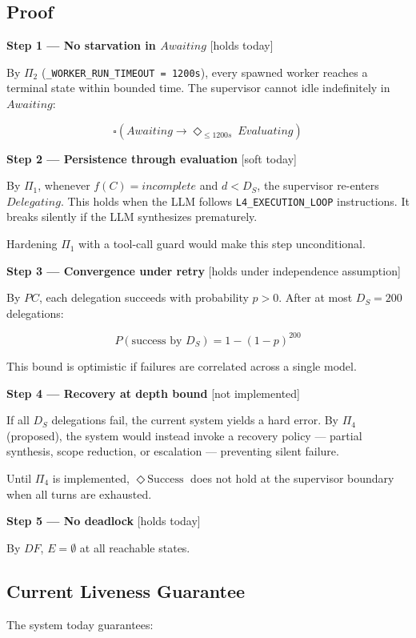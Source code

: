 \subsection*{Proof}

\textbf{Step 1 — No starvation in $Awaiting$} [holds today]

By $\Pi_2$ (\texttt{\_WORKER\_RUN\_TIMEOUT = 1200s}), every spawned worker reaches
a terminal state within bounded time. The supervisor cannot idle indefinitely
in $Awaiting$:

\[ \square \left( Awaiting \rightarrow \Diamond_{\leq 1200s}\ Evaluating \right) \]

\textbf{Step 2 — Persistence through evaluation} [soft today]

By $\Pi_1$, whenever $f(C) = incomplete$ and $d < D_S$, the supervisor
re-enters $Delegating$. This holds when the LLM follows \texttt{L4\_EXECUTION\_LOOP}
instructions. It breaks silently if the LLM synthesizes prematurely.

Hardening $\Pi_1$ with a tool-call guard would make this step unconditional.

\textbf{Step 3 — Convergence under retry} [holds under independence assumption]

By $PC$, each delegation succeeds with probability $p > 0$.
After at most $D_S = 200$ delegations:

\[ P(\text{success by } D_S) = 1 - (1-p)^{200} \]

This bound is optimistic if failures are correlated across a single model.

\textbf{Step 4 — Recovery at depth bound} [not implemented]

If all $D_S$ delegations fail, the current system yields a hard error.
By $\Pi_4$ (proposed), the system would instead invoke a recovery policy —
partial synthesis, scope reduction, or escalation — preventing silent failure.

Until $\Pi_4$ is implemented, $\Diamond\ \text{Success}$ does not hold
at the supervisor boundary when all turns are exhausted.

\textbf{Step 5 — No deadlock} [holds today]

By $DF$, $E = \emptyset$ at all reachable states.

\subsection*{Current Liveness Guarantee}

The system today guarantees:

